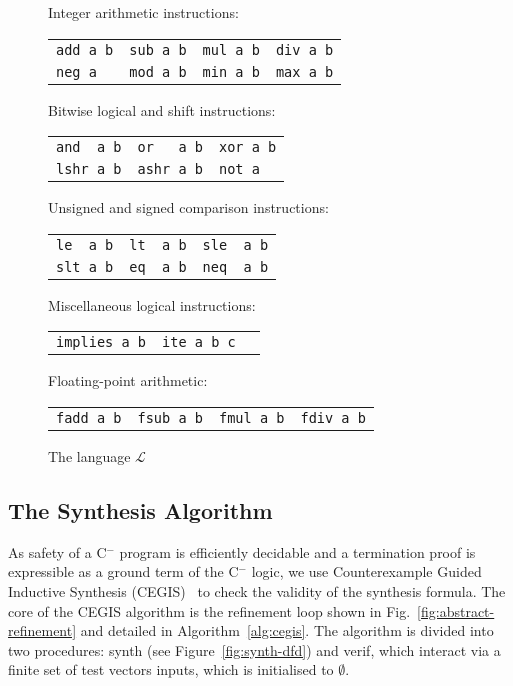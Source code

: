 \documentclass[preprint]{sigplanconf}
\theoremstyle{definition}
\newcommand{\newC}{C$^-$\xspace}
\begin{document}
\begin{figure}
{\small
\begin{center}
\setlength{\tabcolsep}{16pt}
Integer arithmetic instructions:

\begin{tabular}{llll}
 \verb|add a b| & \verb|sub a b| & \verb|mul a b| & \verb|div a b| \\
 \verb|neg a| &   \verb|mod a b| & \verb|min a b| & \verb|max a b|
\end{tabular}

\medskip

Bitwise logical and shift instructions:

\begin{tabular}{lll}
 \verb|and  a b| & \verb|or   a b| & \verb|xor a b| \\
 \verb|lshr a b| & \verb|ashr a b| & \verb|not a|
\end{tabular}

\medskip

Unsigned and signed comparison instructions:

\begin{tabular}{lll}
 \verb|le  a b| & \verb|lt  a b| & \verb|sle  a b| \\
 \verb|slt a b| & \verb|eq  a b| & \verb|neq  a b|
\end{tabular}

Miscellaneous logical instructions:

\begin{tabular}{lll}
 \verb|implies a b| & \verb|ite a b c| & 
\end{tabular}

Floating-point arithmetic:

\begin{tabular}{llll}
 \verb|fadd a b| & \verb|fsub a b| & \verb|fmul a b| & \verb|fdiv a b| 
\end{tabular}


\end{center}
}
 \caption{The language $\mathcal{L}$}
 \label{fig:l-language}
\end{figure}


\subsection{The Synthesis Algorithm}
As safety of a \newC program is efficiently 
decidable and a termination proof is expressible as a ground term of the \newC logic, we use
Counterexample Guided Inductive Synthesis (CEGIS)~\cite{lezama-thesis,sketch} to
check the validity of the synthesis formula. 
The core of the CEGIS algorithm is the refinement loop shown in Fig.~\ref{fig:abstract-refinement} and
detailed in Algorithm~\ref{alg:cegis}.  
The algorithm is divided into two
procedures: {\sc synth} (see Figure~\ref{fig:synth-dfd}) and {\sc verif}, which interact via
a finite set of test vectors {\sc inputs}, which is initialised to $\emptyset$.
\end{document}
